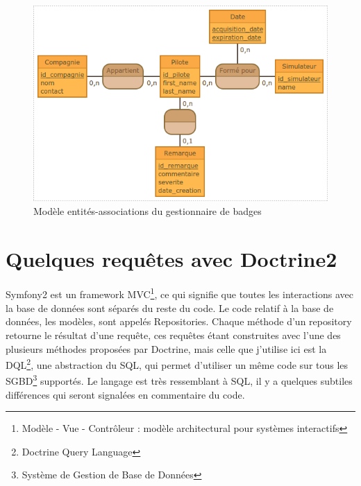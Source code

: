 \documentclass[a4paper,french,11pt,openany,oneside]{memoir}
\begin{document}
\begin{center}
\begin{figure}[ht]
\centering
    \includegraphics[width=1.0\textwidth]{img/BDD}
    \caption{Modèle entités-associations du gestionnaire de badges}
    \label{entites-associations}
\end{figure}
\end{center}

\chapter{Quelques requêtes avec Doctrine2}
\label{dql-outdated-pilots}

Symfony2 est un framework MVC\footnote{Modèle - Vue - Contrôleur : modèle architectural pour systèmes interactifs}, ce qui signifie que toutes les interactions avec la base de données sont séparés du reste du code. Le code relatif à la base de données, les modèles, sont appelés Repositories. Chaque méthode d'un repository retourne le résultat d'une requête, ces requêtes étant construites avec l'une des plusieurs méthodes proposées par Doctrine, mais celle que j'utilise ici est la DQL\footnote{Doctrine Query Language}, une abstraction du SQL, qui permet d'utiliser un même code sur tous les SGBD\footnote{Système de Gestion de Base de Données} supportés. Le langage est très ressemblant à SQL, il y a quelques subtiles différences qui seront signalées en commentaire du code.
\\
\end{document}
